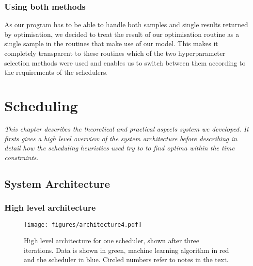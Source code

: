 \documentclass[a4paper,12pt,twoside,openright]{report}
\begin{document}



\subsection{Using both methods} %

As our program has to be able to handle both samples and single results returned by optimisation, we decided to treat the result of our optimisation routine as a single sample in the routines that make use of our model. This makes it completely transparent to these routines which of the two hyperparameter selection methods were used and enables us to switch between them according to the requirements of the schedulers.










\chapter{Scheduling} 


\textit{This chapter describes the theoretical and practical aspects system we developed. It firsts gives a high level overview of the system architecture before describing in detail how the scheduling heuristics used try to to find optima within the time constraints.}

\section{System Architecture}

\subsection{High level architecture}
\begin{figure}[p]
    \centerline{\texttt{[image: figures/architecture4.pdf]}}
  \caption{High level architecture for one scheduler, shown after three iterations. Data is shown in green, machine learning algorithm in red and the scheduler in blue. Circled numbers refer to notes in the text.}
    \label{architecture}
\end{figure}
\end{document}

